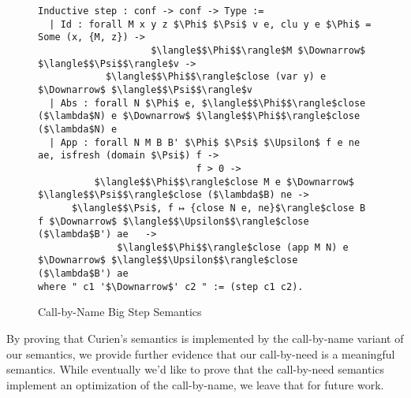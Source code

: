 \begin{figure}
\begin{lstlisting}
Inductive step : conf -> conf -> Type :=
  | Id : forall M x y z $\Phi$ $\Psi$ v e, clu y e $\Phi$ = Some (x, {M, z}) -> 
                    $\langle$$\Phi$$\rangle$M $\Downarrow$ $\langle$$\Psi$$\rangle$v ->
            $\langle$$\Phi$$\rangle$close (var y) e $\Downarrow$ $\langle$$\Psi$$\rangle$v
  | Abs : forall N $\Phi$ e, $\langle$$\Phi$$\rangle$close ($\lambda$N) e $\Downarrow$ $\langle$$\Phi$$\rangle$close ($\lambda$N) e
  | App : forall N M B B' $\Phi$ $\Psi$ $\Upsilon$ f e ne ae, isfresh (domain $\Psi$) f -> 
                            f > 0 ->
          $\langle$$\Phi$$\rangle$close M e $\Downarrow$ $\langle$$\Psi$$\rangle$close ($\lambda$B) ne -> 
      $\langle$$\Psi$, f ↦ {close N e, ne}$\rangle$close B f $\Downarrow$ $\langle$$\Upsilon$$\rangle$close ($\lambda$B') ae   ->
              $\langle$$\Phi$$\rangle$close (app M N) e $\Downarrow$ $\langle$$\Upsilon$$\rangle$close ($\lambda$B') ae
where " c1 '$\Downarrow$' c2 " := (step c1 c2).
\end{lstlisting}
\caption{Call-by-Name Big Step Semantics}
\label{fig:bigstepname}
\end{figure}

By proving that Curien's semantics is implemented by the call-by-name variant of
our semantics, we provide further evidence that our call-by-need is a
meaningful semantics. While eventually we'd like to prove that the call-by-need
semantics implement an optimization of the call-by-name, we leave that for
future work.
